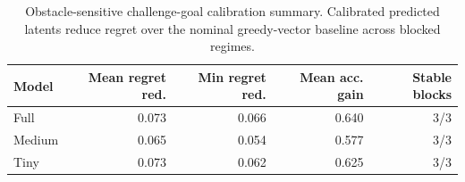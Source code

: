 \begin{table}[t]
\centering
\small
\begin{tabular}{lrrrr}
\toprule
Model & Mean regret red. & Min regret red. & Mean acc. gain & Stable blocks \\
\midrule
Full & 0.073 & 0.066 & 0.640 & 3/3 \\
Medium & 0.065 & 0.054 & 0.577 & 3/3 \\
Tiny & 0.073 & 0.062 & 0.625 & 3/3 \\
\bottomrule
\end{tabular}
\caption{Obstacle-sensitive challenge-goal calibration summary. Calibrated predicted latents reduce regret over the nominal greedy-vector baseline across blocked regimes.}
\label{tab:challenge_goal_calibration_summary}
\end{table}
